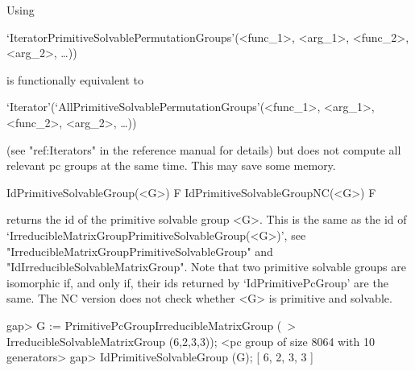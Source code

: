 Using 

`IteratorPrimitiveSolvablePermutationGroups'(<func_1>, <arg_1>, <func_2>, <arg_2>, \dots)) 

is functionally equivalent to 

`Iterator'(`AllPrimitiveSolvablePermutationGroups'(<func_1>, <arg_1>, <func_2>, <arg_2>, \dots))

(see "ref:Iterators" in the {\GAP} reference manual for details) but does not 
compute all relevant pc groups at the same time. 
This may save some memory. 



\>IdPrimitiveSolvableGroup(<G>) F
\>IdPrimitiveSolvableGroupNC(<G>) F

returns the id of the primitive solvable group <G>. This is the same as
the id of `IrreducibleMatrixGroupPrimitiveSolvableGroup(<G>)', see "IrreducibleMatrixGroupPrimitiveSolvableGroup" and "IdIrreducibleSolvableMatrixGroup".
Note that two primitive solvable groups are isomorphic if, and only if, their
ids returned by `IdPrimitivePcGroup' are the same. The NC version does not
check whether <G> is primitive and solvable.

\beginexample
gap> G := PrimitivePcGroupIrreducibleMatrixGroup (\
>             IrreducibleSolvableMatrixGroup (6,2,3,3));
<pc group of size 8064 with 10 generators>
gap> IdPrimitiveSolvableGroup (G);
[ 6, 2, 3, 3 ]
\endexample


